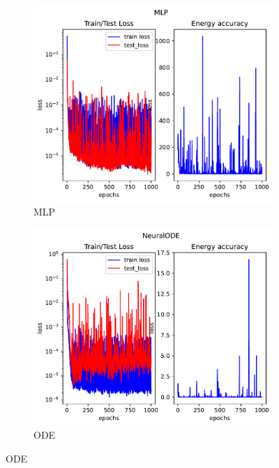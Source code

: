 \begin{figure}[H]
	
	\centering
	\begin{subfigure}[b]{0.3\textwidth}
		\centering
		\includegraphics[width=\textwidth]{chapters/chapter5/osci_mlp_loss.pdf}
		\caption{MLP}
	\end{subfigure}
	\hfill
	\begin{subfigure}[b]{0.3\textwidth}
		\centering
		\includegraphics[width=\textwidth]{chapters/chapter5/osci_ode_loss.pdf}
		\caption{ODE}
	\end{subfigure}

\end{figure}
